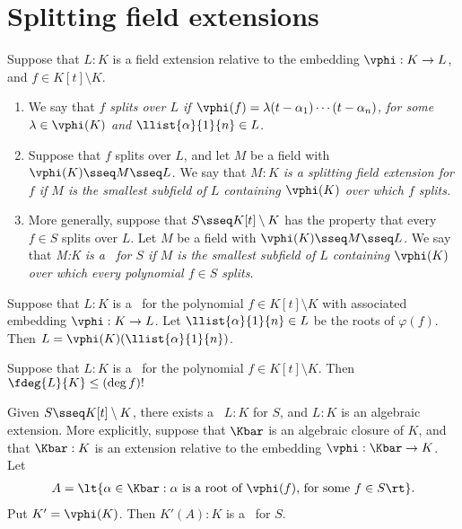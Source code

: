 \documentclass[a4paper]{article}
\begin{document}
\section{Splitting field extensions}
\begin{tdefinition}
  Suppose that \( L:K \) is a field extension relative to the embedding \( \vphi : K\to L \), and \( f\in K[t]\setminus K \). \begin{enumerate}[label=(\roman*)]
    \item We say that \it{\( f \) splits over \( L \)} if \( \vphi(f)=\lambda(t-\alpha_1)\cdots(t-\alpha_n) \), for some \( \lambda\in \vphi(K) \) and \( \llist{\alpha}{1}{n}\in L \).
    \item Suppose that \( f \) splits over \( L \), and let \( M \) be a field with \( \vphi(K)\sseq M\sseq L \).
      We say that \it{\( M:K \) is a splitting field extension for \( f \)} if \( M \) is the smallest subfield of \( L \) containing \( \vphi(K) \) over which \( f \) splits.
    \item More generally, suppose that \( S\sseq K[t]\setminus K \) has the property that every \( f\in S \) splits over \( L \).
      Let \( M \) be a field with \( \vphi(K)\sseq M\sseq L \).
      We say that \it{M:K is a \sfe~for \( S \)} if \( M \) is the smallest subfield of \( L \) containing \( \vphi(K) \) over which every polynomial \( f\in S \) splits.
  \end{enumerate}
\end{tdefinition}

\begin{tproposition}
  Suppose that \( L:K \) is a \sfe~for the polynomial \( f\in K[t]\setminus K \) with associated embedding \( \vphi:K\to L \).
  Let \( \llist{\alpha}{1}{n}\in L \) be the roots of \( \varphi(f) \).
  Then \( L=\vphi(K)(\llist{\alpha}{1}{n}) \).
\end{tproposition}

\begin{tproposition}
  Suppose that \( L:K \) is a \sfe~for the polynomial \( f\in K[t]\setminus K \).
  Then \( \fdeg{L}{K}\leq (\deg f)! \)
\end{tproposition}

\begin{tproposition}
  Given \( S\sseq K[t]\setminus K \), there exists a \sfe~\( L:K \) for \( S \), and \( L:K \) is an algebraic extension.
  More explicitly, suppose that \( \Kbar \) is an algebraic closure of \( K \), and that \( \Kbar:K \) is an extension relative to the embedding \( \vphi:\Kbar\to K \). Let
  \begin{align*}
    A=\lt\{ \alpha\in \Kbar : \alpha\text{ is a root of \( \vphi(f) \), for some } f\in S \rt\}.
  \end{align*}
  Put \( K'=\vphi(K) \).
  Then \( K'(A):K \) is a \sfe~for \( S \).
\end{tproposition}
\end{document}
